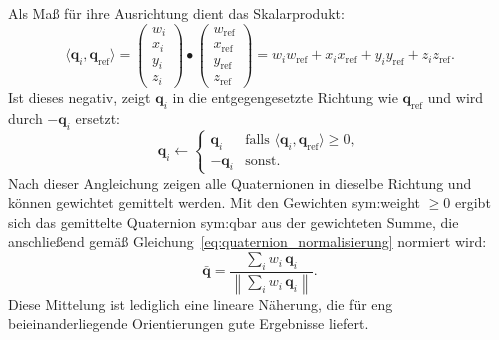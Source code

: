 Als Maß für ihre Ausrichtung dient das Skalarprodukt:
\begin{equation}
\langle \mathbf{q}_i, \mathbf{q}_{\mathrm{ref}} \rangle =
\begin{pmatrix} w_i \\ x_i \\ y_i \\ z_i \end{pmatrix}
\bullet
\begin{pmatrix} w_{\mathrm{ref}} \\ x_{\mathrm{ref}} \\ y_{\mathrm{ref}} \\ z_{\mathrm{ref}} \end{pmatrix}
= w_i w_{\mathrm{ref}} + x_i x_{\mathrm{ref}} + y_i y_{\mathrm{ref}} + z_i z_{\mathrm{ref}}.
\label{eq:quaternion_skalarprodukt}
\end{equation}
Ist dieses negativ, zeigt $\mathbf{q}_i$ in die entgegengesetzte Richtung wie $\mathbf{q}_{\mathrm{ref}}$ und wird durch $-\mathbf{q}_i$ ersetzt:
\begin{equation}
\mathbf{q}_i \leftarrow
\begin{cases}
\mathbf{q}_i & \text{falls } \langle \mathbf{q}_i, \mathbf{q}_{\mathrm{ref}} \rangle \ge 0,\\
-\mathbf{q}_i & \text{sonst.}
\end{cases}
\label{eq:quaternion_vorzeichen}
\end{equation}
Nach dieser Angleichung zeigen alle Quaternionen in dieselbe Richtung und können gewichtet gemittelt werden.
Mit den Gewichten \gls{sym:weight} $\ge 0$ ergibt sich das gemittelte Quaternion \gls{sym:qbar} aus der gewichteten Summe, die anschließend gemäß Gleichung~\ref{eq:quaternion_normalisierung} normiert wird:
\begin{equation}
\bar{\mathbf{q}} = \frac{\displaystyle\sum_{i} w_i\,\mathbf{q}_i}{\left\lVert \displaystyle\sum_{i} w_i\,\mathbf{q}_i \right\rVert}.
\label{eq:quaternion_mittelung}
\end{equation}
Diese Mittelung ist lediglich eine lineare Näherung, die für eng beieinanderliegende Orientierungen gute Ergebnisse liefert.~\cite{Markley2007}

